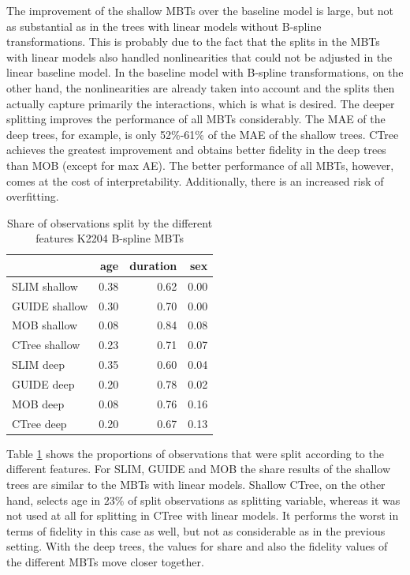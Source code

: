 The improvement of the shallow MBTs over the baseline model is large, but not as substantial as in the trees with linear models without B-spline transformations. This is probably due to the fact that the splits in the MBTs with linear models also handled nonlinearities that could not be adjusted in the linear baseline model. In the baseline model with B-spline transformations, on the other hand, the nonlinearities are already taken into account and the splits then actually capture primarily the interactions, which is what is desired. 
The deeper splitting improves the performance of all MBTs considerably. The MAE of the deep trees, for example, is only 52\%-61\% of the MAE of the shallow trees. CTree achieves the greatest improvement and obtains better fidelity in the deep trees than MOB (except for max AE). The better performance of all MBTs, however, comes at the cost of interpretability. Additionally, there is an increased risk of overfitting.




\begin{table}[!htb]
\centering \scriptsize
\begin{tabular}[t]{l|r|r|r}
\hline
  & age & duration & sex\\
\hline
SLIM shallow & 0.38 & 0.62 & 0.00\\
GUIDE shallow & 0.30 & 0.70 & 0.00\\
MOB shallow & 0.08 & 0.84 & 0.08\\
CTree shallow & 0.23 & 0.71 & 0.07\\
\hline
SLIM deep & 0.35 & 0.60 & 0.04\\
GUIDE deep & 0.20 & 0.78 & 0.02\\
MOB deep & 0.08 & 0.76 & 0.16\\
CTree deep & 0.20 & 0.67 & 0.13\\
\hline
\end{tabular}
\caption{Share of observations split by the different features K2204 B-spline MBTs}
\label{tab:ins_k2204_bsplines_surrogates_share}
\end{table}

Table \ref{tab:ins_k2204_bsplines_surrogates_share}  shows the proportions of observations that were split according to the different features. 
For SLIM, GUIDE and MOB the share results of the shallow trees are similar to the MBTs with linear models. Shallow CTree, on the other hand, selects age in $23\%$ of split observations as splitting variable, whereas it was not used at all for splitting in CTree with linear models. It performs the worst in terms of fidelity in this case as well, but not as considerable as in the previous setting.
With the deep trees, the values for share and also the fidelity values of the different MBTs move closer together.



